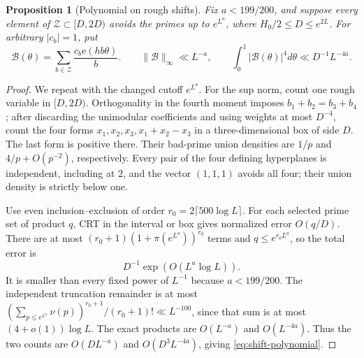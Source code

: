 \documentclass[11pt]{article}
\newtheorem{proposition}[theorem]{Proposition}
\theoremstyle{definition}
\newcommand{\e}{\mathrm e}
\theoremstyle{remark}
\numberwithin{equation}{section}
\begin{document}
\begin{proposition}[Polynomial on rough shifts]\label{lem:shift-polynomial}
Fix $a<199/200$, and suppose every element of $\mathcal Z\subset[D,2D)$ avoids the primes up to $e^{L^a}$,
where $H_0/2\le D\le e^{2L}$. For arbitrary $|c_b|=1$, put
\begin{equation}\label{eq:shift-polynomial}
 \mathcal B(\theta)=\sum_{b\in\mathcal Z}\frac{c_b\e(hb\theta)}b.
 \qquad \|\mathcal B\|_\infty\ll L^{-a},\qquad
 \int_0^1|\mathcal B(\theta)|^4d\theta\ll D^{-1}L^{-4a}.
\end{equation}
\end{proposition}
\begin{proof}
We repeat \cite[Lemma~4.2, pp.~13--14]{OpenAI007} with the changed cutoff $e^{L^a}$.
For the sup norm, count one rough variable in $[D,2D)$.
Orthogonality in the fourth moment imposes $b_1+b_2=b_3+b_4$; after discarding the unimodular coefficients and
using weights at most $D^{-4}$, count the four forms $x_1,x_2,x_3,x_1+x_2-x_3$ in a three-dimensional box of
side $D$. The last form is positive there.
Their bad-prime union densities are $1/p$ and $4/p+O(p^{-2})$, respectively. Every pair of the four defining
hyperplanes is independent, including at $2$, and the vector $(1,1,1)$ avoids all four; their union density is
strictly below one.

Use even inclusion--exclusion of order $r_0=2\lceil500\log L\rceil$.
For each selected prime set of product $q$, CRT in the interval or box gives normalized error $O(q/D)$.
There are at most $(r_0+1)(1+\pi(e^{L^a}))^{r_0}$ terms and $q\le e^{r_0L^a}$, so the total error is
\begin{equation}\label{eq:shift-crt-error}
 D^{-1}\exp(O(L^a\log L)).
\end{equation}
It is smaller than every fixed power of $L^{-1}$ because $a<199/200$.
The independent truncation remainder is at most
$(\sum_{p\le e^{L^a}}\nu(p))^{r_0+1}/(r_0+1)!\ll L^{-100}$, since that sum is at most
$(4+o(1))\log L$. The exact products are $O(L^{-a})$ and $O(L^{-4a})$.
Thus the two counts are $O(DL^{-a})$ and $O(D^3L^{-4a})$, giving \eqref{eq:shift-polynomial}.
\end{proof}
\end{document}
